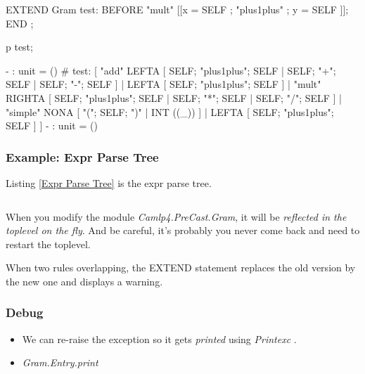 \begin{ocamlcode}
EXTEND Gram
  test: BEFORE "mult" [[x = SELF ; "plus1plus" ; y = SELF ]];
END ;

p  test;

    - : unit = ()
#   test: [ "add" LEFTA
  [ SELF; "plus1plus"; SELF
  | SELF; "+"; SELF
  | SELF; "-"; SELF ]
| LEFTA
  [ SELF; "plus1plus"; SELF ]
| "mult" RIGHTA
  [ SELF; "plus1plus"; SELF
  | SELF; "*"; SELF
  | SELF; "/"; SELF ]
| "simple" NONA
  [ "("; SELF; ")"
  | INT ((_)) ]
| LEFTA
  [ SELF; "plus1plus"; SELF ] ]
- : unit = ()  
\end{ocamlcode}

\subsubsection{Example: Expr Parse Tree}

Listing \ref{Expr Parse Tree} is the expr parse tree.

\inputminted[fontsize=\scriptsize]{ocaml}{code/camlp4/expr_parse_tree/first.ml}




When you modify the module \textit{Camlp4.PreCast.Gram}, it will be
\textit{reflected in the toplevel on the fly}. And be careful, it's
probably you never come back and need to restart the toplevel.

When two rules overlapping, the EXTEND statement replaces the
old version by the new one and displays a warning. 


\subsubsection{Debug}
\begin{itemize}

\item We can re-raise the exception so it gets \textit{printed}
  using \textit{Printexc} .

\item \textit{Gram.Entry.print}

\end{itemize}


